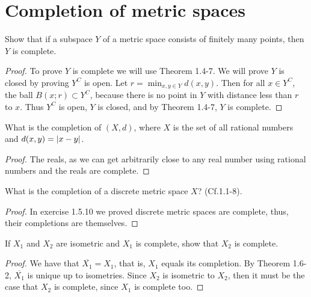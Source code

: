 \section{Completion of metric spaces}


\begin{exercise}{1}
Show that if a subspace $Y$ of a metric space consists of finitely many points, then $Y$ is complete.
\end{exercise}
\begin{proof}
To prove $Y$ is complete we will use Theorem 1.4-7. We will prove $Y$ is closed by proving $Y^C$ is open. Let $r=\min_{x,y\in Y}d(x,y)$. Then for all $x\in Y^C$, the ball $B(x;r)\subset Y^C$, because there is no point in $Y$ with distance less than $r$ to $x$. Thus $Y^C$ is open, $Y$ is closed, and by Theorem 1.4-7, $Y$ is complete.
\end{proof}

\begin{exercise}{2}
What is the completion of $(X,d)$, where $X$ is the set of all rational numbers and $d(x,y)=\left\lvert x-y\right\rvert$.
\end{exercise}
\begin{proof}
The reals, as we can get arbitrarily close to any real number using rational numbers and the reals are complete.
\end{proof}

\begin{exercise}{3}
What is the completion of a discrete metric space $X$? (Cf.1.1-8).
\end{exercise}
\begin{proof}
In exercise 1.5.10 we proved discrete metric spaces are complete, thus, their completions are themselves.
\end{proof}

\begin{exercise}{4}
If $X_1$ and $X_2$ are isometric and $X_1$ is complete, show that $X_2$ is complete.
\end{exercise}
\begin{proof}
We have that $\overline{X_1}=X_1$, that is, $X_1$ equals its completion. By Theorem 1.6-2, $\overline{X_1}$ is unique up to isometries. Since $X_2$ is isometric to $X_2$, then it must be the case that $X_2$ is complete, since $X_1$ is complete too.
\end{proof}

